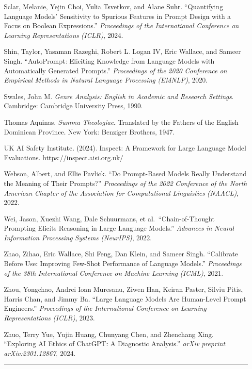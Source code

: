 \documentclass[10pt, letterpaper, twocolumn]{article}
\begin{document}
Sclar, Melanie, Yejin Choi, Yulia Tsvetkov, and Alane Suhr. ``Quantifying Language Models' Sensitivity to Spurious Features in Prompt Design with a Focus on Boolean Expressions.'' \emph{Proceedings of the International Conference on Learning Representations (ICLR)}, 2024.

Shin, Taylor, Yasaman Razeghi, Robert L. Logan IV, Eric Wallace, and Sameer Singh. ``AutoPrompt: Eliciting Knowledge from Language Models with Automatically Generated Prompts.'' \emph{Proceedings of the 2020 Conference on Empirical Methods in Natural Language Processing (EMNLP)}, 2020.

Swales, John M. \emph{Genre Analysis: English in Academic and Research Settings}. Cambridge: Cambridge University Press, 1990.

Thomas Aquinas. \emph{Summa Theologiae}. Translated by the Fathers of the English Dominican Province. New York: Benziger Brothers, 1947.

UK AI Safety Institute. (2024). Inspect: A Framework for Large Language Model Evaluations. https://inspect.aisi.org.uk/

Webson, Albert, and Ellie Pavlick. ``Do Prompt-Based Models Really Understand the Meaning of Their Prompts?'' \emph{Proceedings of the 2022 Conference of the North American Chapter of the Association for Computational Linguistics (NAACL)}, 2022.

Wei, Jason, Xuezhi Wang, Dale Schuurmans, et al.~``Chain-of-Thought Prompting Elicits Reasoning in Large Language Models.'' \emph{Advances in Neural Information Processing Systems (NeurIPS)}, 2022.

Zhao, Zihao, Eric Wallace, Shi Feng, Dan Klein, and Sameer Singh. ``Calibrate Before Use: Improving Few-Shot Performance of Language Models.'' \emph{Proceedings of the 38th International Conference on Machine Learning (ICML)}, 2021.

Zhou, Yongchao, Andrei Ioan Muresanu, Ziwen Han, Keiran Paster, Silviu Pitis, Harris Chan, and Jimmy Ba. ``Large Language Models Are Human-Level Prompt Engineers.'' \emph{Proceedings of the International Conference on Learning Representations (ICLR)}, 2023.

Zhuo, Terry Yue, Yujin Huang, Chunyang Chen, and Zhenchang Xing. ``Exploring AI Ethics of ChatGPT: A Diagnostic Analysis.'' \emph{arXiv preprint arXiv:2301.12867}, 2024.

\begin{center}\rule{0.5\linewidth}{0.5pt}\end{center}
\end{document}
